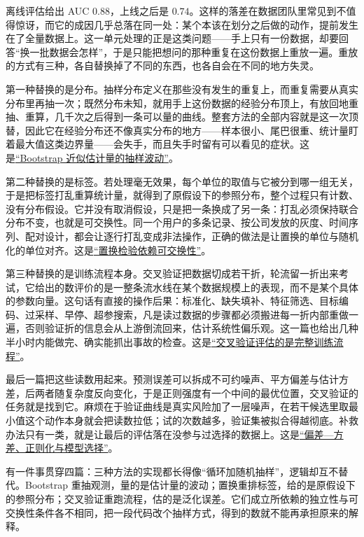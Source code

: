 离线评估给出 AUC \(0.88\)，上线之后是 \(0.74\)。这样的落差在数据团队里常见到不值得惊讶，而它的成因几乎总落在同一处：某个本该在划分之后做的动作，提前发生在了全量数据上。这一单元处理的正是这类问题——手上只有一份数据，却要回答``换一批数据会怎样''，于是只能把想问的那种重复在这份数据上重放一遍。重放的方式有三种，各自替换掉了不同的东西，也各自会在不同的地方失灵。

第一种替换的是分布。抽样分布定义在那些没有发生的重复上，而重复需要从真实分布里再抽一次；既然分布未知，就用手上这份数据的经验分布顶上，有放回地重抽、重算，几千次之后得到一条可以量的曲线。整套方法的全部内容就是这一次顶替，因此它在经验分布还不像真实分布的地方——样本很小、尾巴很重、统计量盯着最大值这类边界量——会失手，而且失手时留有可以看见的症状。这是\hyperref[sec:11-Mathematical-Statistics/06-Resampling-and-Model-Selection/01]{``Bootstrap 近似估计量的抽样波动''}。

第二种替换的是标签。若处理毫无效果，每个单位的取值与它被分到哪一组无关，于是把标签打乱重算统计量，就得到了原假设下的参照分布，整个过程只有计数、没有分布假设。它并没有取消假设，只是把一条换成了另一条：打乱必须保持联合分布不变，也就是可交换性。同一个用户的多条记录、按公司发放的灰度、时间序列、配对设计，都会让逐行打乱变成非法操作，正确的做法是让置换的单位与随机化的单位对齐。这是\hyperref[sec:11-Mathematical-Statistics/06-Resampling-and-Model-Selection/02]{``置换检验依赖可交换性''}。

第三种替换的是训练流程本身。交叉验证把数据切成若干折，轮流留一折出来考试，它给出的数评价的是一整条流水线在某个数据规模上的表现，而不是某个具体的参数向量。这句话有直接的操作后果：标准化、缺失填补、特征筛选、目标编码、过采样、早停、超参搜索，凡是读过数据的步骤都必须搬进每一折内部重做一遍，否则验证折的信息会从上游倒流回来，估计系统性偏乐观。这一篇也给出几种半小时内能做完、确实能抓出事故的检查。这是\hyperref[sec:11-Mathematical-Statistics/06-Resampling-and-Model-Selection/03]{``交叉验证评估的是完整训练流程''}。

最后一篇把这些读数用起来。预测误差可以拆成不可约噪声、平方偏差与估计方差，后两者随复杂度反向变化，于是正则强度有一个中间的最优位置，交叉验证的任务就是找到它。麻烦在于验证曲线是真实风险加了一层噪声，在若干候选里取最小值这个动作本身就会把读数拉低；试的次数越多，验证集被拟合得越彻底。补救办法只有一类，就是让最后的评估落在没参与过选择的数据上。这是\hyperref[sec:11-Mathematical-Statistics/06-Resampling-and-Model-Selection/04]{``偏差---方差、正则化与模型选择''}。

有一件事贯穿四篇：三种方法的实现都长得像``循环加随机抽样''，逻辑却互不替代。Bootstrap 重抽观测，量的是估计量的波动；置换重排标签，给的是原假设下的参照分布；交叉验证重跑流程，估的是泛化误差。它们成立所依赖的独立性与可交换性条件各不相同，把一段代码改个抽样方式，得到的数就不能再承担原来的解释。

